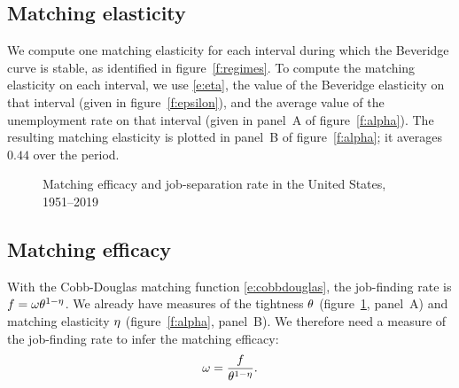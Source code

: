 \documentclass[letterpaper,12pt,leqno]{article}
\def\pdf{../../figures/xhosios_202103.pdf}
\begin{document}
\subsection{Matching elasticity} 

We compute one matching elasticity for each interval during which the Beveridge curve is stable, as identified in figure~\ref{f:regimes}.  To compute the matching elasticity on each interval, we use \eqref{e:eta}, the value of the Beveridge elasticity on that interval (given in figure~\ref{f:epsilon}), and the average value of the unemployment rate on that interval (given in panel~A of figure~\ref{f:alpha}). The resulting matching elasticity is plotted in panel~B of figure~\ref{f:alpha}; it averages $0.44$ over the period. 

\begin{figure}[t!]
\hfill
{}\vfig
{}\hfill
{}
\caption{Matching efficacy and job-separation rate in the United States, 1951--2019}
\label{f:cps}\end{figure}

\subsection{Matching efficacy} 

With the Cobb-Douglas matching function \eqref{e:cobbdouglas}, the job-finding rate is $f = \omega \theta^{1-\eta}$. We already have measures of the tightness $\theta$ (figure~\ref{f:cps}, panel~A) and matching elasticity $\eta$ (figure~\ref{f:alpha}, panel~B). We therefore need a measure of the job-finding rate to infer the matching efficacy: 
\begin{equation}
\omega = \frac{f}{\theta^{1-\eta}}.
\label{e:mu}\end{equation}
\end{document}
